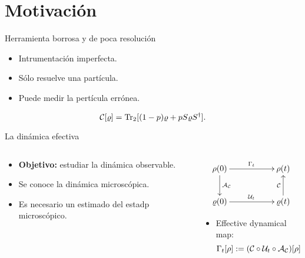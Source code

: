 \section{Motivación}

\begin{frame}{Herramienta borrosa y de poca resolución}
    \begin{itemize}
        \item Intrumentación imperfecta.
        \item Sólo resuelve una partícula.
        \item Puede medir la pertícula errónea.
    \end{itemize}
    \begin{equation*}
        \mathcal{C}[\varrho]=\Tr_{2}[(1-p)\varrho+pS\varrho S^{\dag}].
    \end{equation*}
\end{frame}

\begin{frame}{La dinámica efectiva}
    \begin{columns}
        \begin{column}{0.5\textwidth}
            \begin{itemize}
                \item \textbf{Objetivo:} estudiar la dinámica observable.
                \item Se conoce la dinámica microscópica.
                \item Es necesario un estimado del estadp microscópico. 
            \end{itemize}
        \end{column}
        \begin{column}{0.5\textwidth}
            \begin{displaymath}
                \xymatrix{
                  {\rho(0)} \ar[rr]^{\Gamma_{t}} \ar[d]^{\mcA_{\mcC}}
                  && {\rho(t)}\\
                  {\varrho(0)} \ar[rr]^{\mcU_{t}}
                  && {\varrho(t)} \ar[u]^{\mcC}
                }
              \end{displaymath}
              \begin{itemize}
              \item Effective dynamical map:
                \begin{equation*}
                    \Gamma_t[\rho]:=(\mathcal{C} \circ \mathcal{U}_t \circ \mathcal{A}_{\mathcal{C}})[\rho].
                \end{equation*}
            \end{itemize}
        \end{column}
    \end{columns}
\end{frame}
